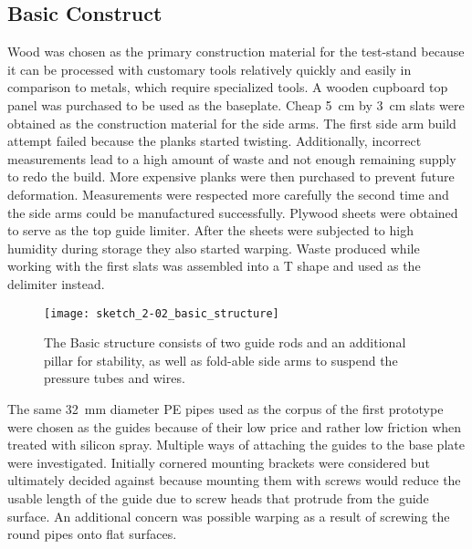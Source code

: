 \subsection{Basic Construct}

Wood was chosen as the primary construction material for the test-stand because it can be processed with customary tools relatively quickly and easily in comparison to metals, which require specialized tools. A wooden cupboard top panel was purchased to be used as the baseplate. Cheap \SI{5}{\centi\meter} by \SI{3}{\centi\meter} slats were obtained as the construction material for the side arms. The first side arm build attempt failed because the planks started twisting. Additionally, incorrect measurements lead to a high amount of waste and not enough remaining supply to redo the build. More expensive planks were then purchased to prevent future deformation. Measurements were respected more carefully the second time and the side arms could be manufactured successfully. Plywood sheets were obtained to serve as the top guide limiter. After the sheets were subjected to high humidity during storage they also started warping. Waste produced while working with the first slats was assembled into a T shape and used as the delimiter instead.

\begin{figure}[H]
\centering

\texttt{[image: sketch\_2-02\_basic\_structure]}

\caption{The Basic structure consists of two guide rods and an additional pillar for stability, as well as fold-able side arms to suspend the pressure tubes and wires.}
\end{figure}

The same \SI{32}{\milli\meter} diameter PE pipes used as the corpus of the first prototype were chosen as the guides because of their low price and rather low friction when treated with silicon spray. Multiple ways of attaching the guides to the base plate were investigated. 
Initially cornered mounting brackets were considered but ultimately decided against because mounting them with screws would reduce the usable length of the guide due to screw heads that protrude from the guide surface. An additional concern was possible warping as a result of screwing the round pipes onto flat surfaces. 

